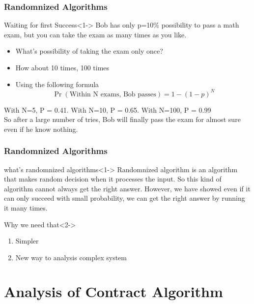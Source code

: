 \documentclass{beamer}
\begin{document}
\begin{frame}
\frametitle{Randomnized Algorithms }
\begin{block}{Waiting for first Success}<1->
	Bob has only p=10\% possibility to pass a math exam, but you can take the exam as many times as you like. 
	\begin{itemize}
		\item What's possibility of taking the exam only once?
		\item How about 10 times, 100 times 
	\end{itemize}
\end{block}
\begin{itemize}
	\item Using the following formula 
	\begin{equation*}
		\Pr\left(\text{Within N exams, Bob passes}\right)=1-(1-p)^N
	\end{equation*}
\end{itemize}
With N=5, P = 0.41. With N=10, P = 0.65.
With N=100, P = 0.99 \\
So after a large number of tries, Bob will finally pass the exam for almost sure even if he know nothing.

\end{frame}
\begin{frame}
	\frametitle{Randomnized Algorithms}
	\begin{block}{ what's randomnized algorithms}<1->
	Randomnized algorithm is an algorithm that makes random decision when it processes the input. So this kind of algorithm cannot always get the right answer.
	However, we have showed even if it can only succeed with small probability, we can get the right answer by running it many times. 	
	\end{block}
	\begin{block}{Why we need that}<2->
		\begin{enumerate}
			\item Simpler
			\item New way to analysis complex system
		\end{enumerate}
	\end{block}
\end{frame}
\section{Analysis of Contract Algorithm}

\end{document}
